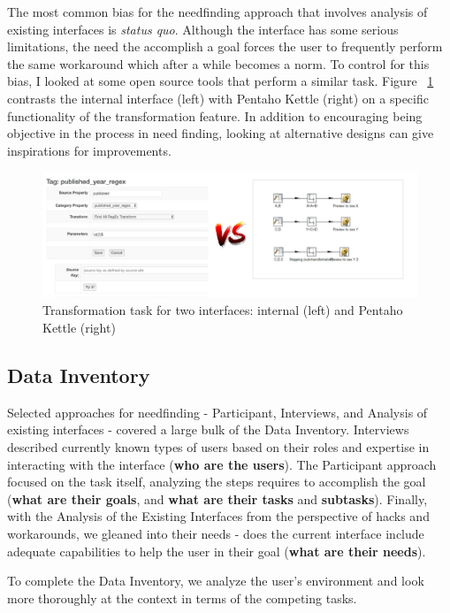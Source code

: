 \documentclass[12pt,letterpaper]{article}
\begin{document}
\bigskip
The most common bias for the needfinding approach that involves analysis of existing interfaces is \textit{status quo}. Although the interface has some serious limitations, the need the accomplish a goal forces the user to frequently perform the same workaround which after a while becomes a norm. To control for this bias, I looked at some open source tools that perform a similar task. Figure ~\ref{fig::1} contrasts the internal interface (left) with Pentaho Kettle (right) on a specific functionality of the transformation feature. In addition to encouraging being objective in the process in need finding, looking at alternative designs can give inspirations for improvements. 

\begin{figure}[h]
\centering
\includegraphics[scale=.35]{alternatives.png}
\caption{Transformation task for two interfaces: internal (left) and Pentaho Kettle (right)}
\label{fig::1}
\end{figure}

\subsection*{Data Inventory}
Selected approaches for needfinding - Participant, Interviews, and Analysis of existing interfaces - covered a large bulk of the Data Inventory. Interviews described currently known types of users based on their roles and expertise in interacting with the interface (\textbf{who are the users}). The Participant approach focused on the task itself, analyzing the steps requires to accomplish the goal (\textbf{what are their goals}, and \textbf{what are their tasks} and \textbf{subtasks}). Finally, with the Analysis of the Existing Interfaces from the perspective of hacks and workarounds, we gleaned into their needs - does the current interface include adequate capabilities to help the user in their goal (\textbf{what are their needs}). 

To complete the Data Inventory, we analyze the user's environment and look more thoroughly at the context in terms of the competing tasks.
\end{document}
